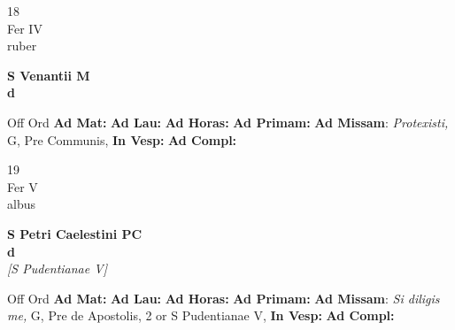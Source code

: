 \documentclass[10pt, openany]{book}
\begin{document}
    \begin{center}
        \begin{minipage}{3.5in}
            \vspace{2em}
            \begin{minipage}{0.5in}
                {\Huge 18} \\
                {\normalsize Fer IV} \\
                {\normalsize ruber}
            \end{minipage}
            \begin{minipage}{3.0in}
                \textbf{ \large S Venantii M \\
                \textnormal{\normalsize d}} \\ 
            \end{minipage}
            \begin{justify}Off Ord
                \textbf{Ad Mat: }
                \textbf{Ad Lau: }
                \textbf{Ad Horas: }
                \textbf{Ad Primam: }\textbf{Ad Missam}: \textit{Protexisti,} G, Pre Communis,  
                \textbf{In Vesp: }
                \textbf{Ad Compl: }
            \end{justify}
        \end{minipage}
    \end{center}

    \begin{center}
        \begin{minipage}{3.5in}
            \vspace{2em}
            \begin{minipage}{0.5in}
                {\Huge 19} \\
                {\normalsize Fer V} \\
                {\normalsize albus}
            \end{minipage}
            \begin{minipage}{3.0in}
                \textbf{ \large S Petri Caelestini PC \\
                \textnormal{\normalsize d}} \\ \textit{[S Pudentianae V]} \\ 
            \end{minipage}
            \begin{justify}Off Ord
                \textbf{Ad Mat: }
                \textbf{Ad Lau: }
                \textbf{Ad Horas: }
                \textbf{Ad Primam: }\textbf{Ad Missam}: \textit{Si diligis me,} G, Pre de Apostolis, 2 or S Pudentianae V,  
                \textbf{In Vesp: }
                \textbf{Ad Compl: }
            \end{justify}
        \end{minipage}
    \end{center}
\end{document}
